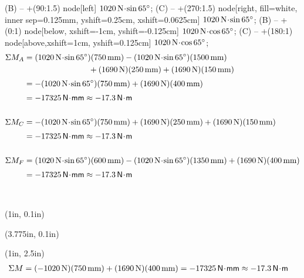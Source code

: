 \documentclass[10pt,oneside]{article}
\def\scale{1}
\begin{document}
\begin{textblock*}{6.75in}
{     (B) -- +(90:1.5) node[left] {$1020\,\text{N}\!\cdot\! \sin 65^\circ $};
     (C) -- +(270:1.5) node[right, fill=white, inner sep=0.125mm, yshift=0.25cm, xshift=0.0625cm] {$1020\,\text{N}\!\cdot\! \sin 65^\circ $};
     (B) -- +(0:1) node[below, xshift=-1cm, yshift=-0.125cm] {$1020\,\text{N}\!\cdot\! \cos 65^\circ $};
     (C) -- +(180:1) node[above,xshift=1cm,  yshift=0.125cm] {$1020\,\text{N}\!\cdot\! \cos 65^\circ $};
  }
  \large
  \begin{align*}
    \Sigma M_A &= (1020\,\text{N}\cd\sin 65\deg)(750\,\text{mm})-(1020\,\text{N}\cd\sin 65\deg)(1500\,\text{mm}) \\ &\qquad\qquad\qquad\qquad + (1690\,\text{N})(250\,\text{mm})+(1690\,\text{N})(150\,\text{mm}) \\[0.25em]
    &=  -(1020\,\text{N}\cd\sin 65\deg)(750\,\text{mm}) + (1690\,\text{N})(400\,\text{mm}) \\[0.25em] 
    &= -17325\,\mathsf{N\cd mm} \approx -17.3\,\mathsf{N\cd m} \\\\
    \Sigma M_C &= -(1020\,\text{N}\cd\sin 65\deg)(750\,\text{mm}) +  (1690\,\text{N})(250\,\text{mm})+(1690\,\text{N})(150\,\text{mm}) \\[0.25em]
    &= -17325\,\mathsf{N\cd mm}\approx -17.3\,\mathsf{N\cd m} \\\\
    \Sigma M_F &= (1020\,\text{N}\cd\sin 65\deg)(600\,\text{mm})-(1020\,\text{N}\cd\sin 65\deg)(1350\,\text{mm})+(1690\,\text{N})(400\,\text{mm}) \\[0.25em]
    &= -17325\,\mathsf{N\cd mm}\approx -17.3\,\mathsf{N\cd m}
  \end{align*}
\end{textblock*}



~\newpage

\begin{textblock*}{2.25in}(1in, 0.1in)
\end{textblock*}
\begin{textblock*}{4.125in}(3.775in, 0.1in)
  \cbox{
    \def\scale{0.9}
    
  }
\end{textblock*}
\begin{textblock*}{6.75in}(1in, 2.5in)
  \large
  \begin{align*}
    \Sigma M &= (-1020\,\text{N})(750\,\text{mm})+(1690\,\text{N})(400\,\text{mm})=-17325\,\mathsf{N\!\cdot\! mm}\approx -17.3\,\mathsf{N\!\cdot\! m}
  \end{align*}
\end{textblock*}
\end{document}

